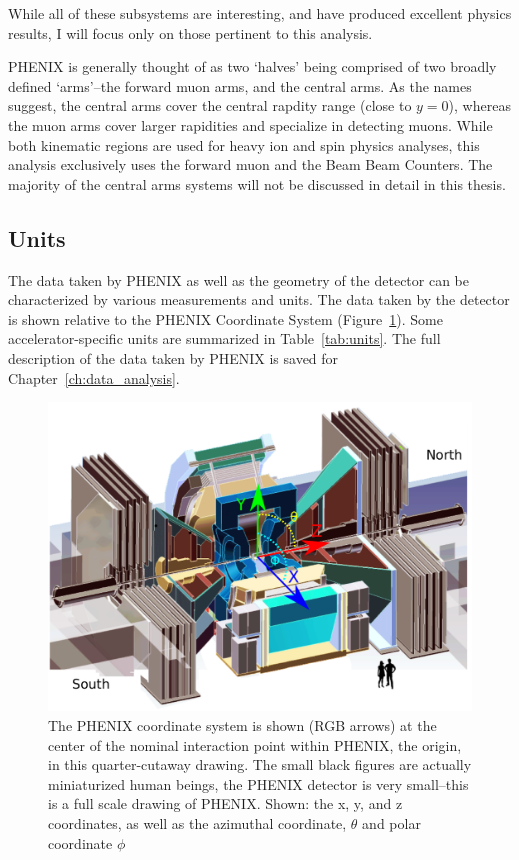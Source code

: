 While all of these subsystems are interesting, and have produced excellent
physics results, I will focus only on those pertinent to this analysis.

PHENIX is generally thought of as two `halves' being comprised of two broadly
defined `arms'--the forward muon arms, and the central arms. As the names
suggest, the central arms cover the central rapdity range (close to $y=0$),
whereas the muon arms cover larger rapidities and specialize in detecting muons.
While both kinematic regions are used for heavy ion and spin physics analyses,
this analysis exclusively uses the forward muon and the Beam Beam Counters. The
majority of the central arms systems will not be discussed in detail in this
thesis.

\subsection{Units}

The data taken by PHENIX as well as the geometry of the detector can be
characterized by various measurements and units. The data taken by the detector
is shown relative to the PHENIX Coordinate System
(Figure~\ref{fig:phenix_coordinate_system}). Some accelerator-specific units
are summarized in Table~\ref{tab:units}. The full description of the data taken
by PHENIX is saved for Chapter~\ref{ch:data_analysis}.

\begin{figure}[ht]
  \centering
  \includegraphics[width=\linewidth]{./figures/phenix_coordinate_system.png}
  \caption{
    The PHENIX coordinate system is shown (RGB arrows) at the center of the
    nominal interaction point within PHENIX, the origin, in this quarter-cutaway
    drawing. The small black figures are actually miniaturized human beings, the
    PHENIX detector is very small--this is a full scale drawing of PHENIX.
    Shown: the x, y, and z coordinates, as well as the azimuthal coordinate,
    $\theta$ and polar coordinate $\phi$ ~\cite{WebPHENIXDrawings}
  }
  \label{fig:phenix_coordinate_system}

\end{figure}

